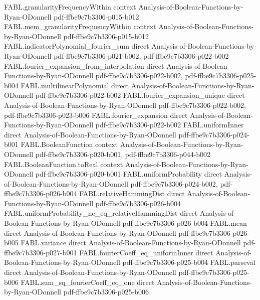 \begin{theorem}
\proofstep
  {FABL.granularityFrequencyWithin}
  {context}
  {Analysis-of-Boolean-Functions-by-Ryan-ODonnell}
  {pdf-ffbe9c7b3306-p015-b012}
\proofstep
  {FABL.mem_granularityFrequencyWithin}
  {context}
  {Analysis-of-Boolean-Functions-by-Ryan-ODonnell}
  {pdf-ffbe9c7b3306-p015-b012}
\proofstep
  {FABL.indicatorPolynomial_fourier_sum}
  {direct}
  {Analysis-of-Boolean-Functions-by-Ryan-ODonnell}
  {pdf-ffbe9c7b3306-p021-b002,
    pdf-ffbe9c7b3306-p022-b002}
\proofstep
  {FABL.fourier_expansion_from_interpolation}
  {direct}
  {Analysis-of-Boolean-Functions-by-Ryan-ODonnell}
  {pdf-ffbe9c7b3306-p022-b002,
    pdf-ffbe9c7b3306-p025-b004}
\proofstep
  {FABL.multilinearPolynomial}
  {direct}
  {Analysis-of-Boolean-Functions-by-Ryan-ODonnell}
  {pdf-ffbe9c7b3306-p022-b002}
\proofstep
  {FABL.fourier_expansion_unique}
  {direct}
  {Analysis-of-Boolean-Functions-by-Ryan-ODonnell}
  {pdf-ffbe9c7b3306-p022-b002,
    pdf-ffbe9c7b3306-p023-b006}
\proofstep
  {FABL.fourier_expansion}
  {direct}
  {Analysis-of-Boolean-Functions-by-Ryan-ODonnell}
  {pdf-ffbe9c7b3306-p022-b002}
\proofstep
  {FABL.uniformInner}
  {direct}
  {Analysis-of-Boolean-Functions-by-Ryan-ODonnell}
  {pdf-ffbe9c7b3306-p024-b001}
\proofstep
  {FABL.BooleanFunction}
  {context}
  {Analysis-of-Boolean-Functions-by-Ryan-ODonnell}
  {pdf-ffbe9c7b3306-p020-b001,
    pdf-ffbe9c7b3306-p044-b002}
\proofstep
  {FABL.BooleanFunction.toReal}
  {context}
  {Analysis-of-Boolean-Functions-by-Ryan-ODonnell}
  {pdf-ffbe9c7b3306-p020-b001}
\proofstep
  {FABL.uniformProbability}
  {direct}
  {Analysis-of-Boolean-Functions-by-Ryan-ODonnell}
  {pdf-ffbe9c7b3306-p024-b002,
    pdf-ffbe9c7b3306-p026-b004}
\proofstep
  {FABL.relativeHammingDist}
  {direct}
  {Analysis-of-Boolean-Functions-by-Ryan-ODonnell}
  {pdf-ffbe9c7b3306-p026-b004}
\proofstep
  {FABL.uniformProbability_ne_eq_relativeHammingDist}
  {direct}
  {Analysis-of-Boolean-Functions-by-Ryan-ODonnell}
  {pdf-ffbe9c7b3306-p026-b004}
\proofstep
  {FABL.mean}
  {direct}
  {Analysis-of-Boolean-Functions-by-Ryan-ODonnell}
  {pdf-ffbe9c7b3306-p026-b005}
\proofstep
  {FABL.variance}
  {direct}
  {Analysis-of-Boolean-Functions-by-Ryan-ODonnell}
  {pdf-ffbe9c7b3306-p027-b001}
\proofstep
  {FABL.fourierCoeff_eq_uniformInner}
  {direct}
  {Analysis-of-Boolean-Functions-by-Ryan-ODonnell}
  {pdf-ffbe9c7b3306-p025-b004}
\proofstep
  {FABL.parseval}
  {direct}
  {Analysis-of-Boolean-Functions-by-Ryan-ODonnell}
  {pdf-ffbe9c7b3306-p025-b006}
\proofstep
  {FABL.sum_sq_fourierCoeff_eq_one}
  {direct}
  {Analysis-of-Boolean-Functions-by-Ryan-ODonnell}
  {pdf-ffbe9c7b3306-p025-b006}

\end{theorem}
